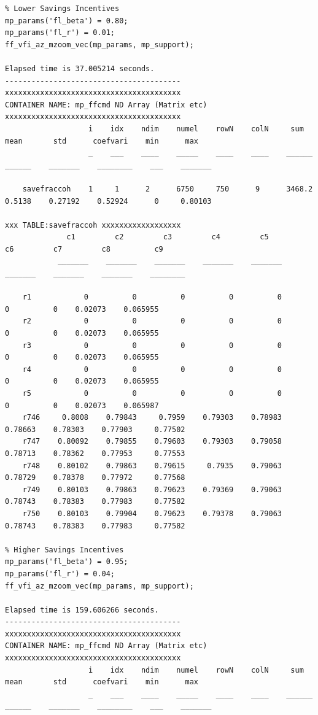 \documentclass[
]{book}
\begin{document}
\begin{verbatim}
% Lower Savings Incentives
mp_params('fl_beta') = 0.80;
mp_params('fl_r') = 0.01;
ff_vfi_az_mzoom_vec(mp_params, mp_support);

Elapsed time is 37.005214 seconds.
----------------------------------------
xxxxxxxxxxxxxxxxxxxxxxxxxxxxxxxxxxxxxxxx
CONTAINER NAME: mp_ffcmd ND Array (Matrix etc)
xxxxxxxxxxxxxxxxxxxxxxxxxxxxxxxxxxxxxxxx
                   i    idx    ndim    numel    rowN    colN     sum       mean       std      coefvari    min      max  
                   _    ___    ____    _____    ____    ____    ______    ______    _______    ________    ___    _______

    savefraccoh    1     1      2      6750     750      9      3468.2    0.5138    0.27192    0.52924      0     0.80103

xxx TABLE:savefraccoh xxxxxxxxxxxxxxxxxx
              c1         c2         c3         c4         c5         c6         c7         c8          c9   
            _______    _______    _______    _______    _______    _______    _______    _______    ________

    r1            0          0          0          0          0          0          0    0.02073    0.065955
    r2            0          0          0          0          0          0          0    0.02073    0.065955
    r3            0          0          0          0          0          0          0    0.02073    0.065955
    r4            0          0          0          0          0          0          0    0.02073    0.065955
    r5            0          0          0          0          0          0          0    0.02073    0.065987
    r746     0.8008    0.79843     0.7959    0.79303    0.78983    0.78663    0.78303    0.77903     0.77502
    r747    0.80092    0.79855    0.79603    0.79303    0.79058    0.78713    0.78362    0.77953     0.77553
    r748    0.80102    0.79863    0.79615     0.7935    0.79063    0.78729    0.78378    0.77972     0.77568
    r749    0.80103    0.79863    0.79623    0.79369    0.79063    0.78743    0.78383    0.77983     0.77582
    r750    0.80103    0.79904    0.79623    0.79378    0.79063    0.78743    0.78383    0.77983     0.77582

% Higher Savings Incentives
mp_params('fl_beta') = 0.95;
mp_params('fl_r') = 0.04;
ff_vfi_az_mzoom_vec(mp_params, mp_support);

Elapsed time is 159.606266 seconds.
----------------------------------------
xxxxxxxxxxxxxxxxxxxxxxxxxxxxxxxxxxxxxxxx
CONTAINER NAME: mp_ffcmd ND Array (Matrix etc)
xxxxxxxxxxxxxxxxxxxxxxxxxxxxxxxxxxxxxxxx
                   i    idx    ndim    numel    rowN    colN     sum       mean       std      coefvari    min      max  
                   _    ___    ____    _____    ____    ____    ______    ______    _______    ________    ___    _______


\end{verbatim}
\end{document}
